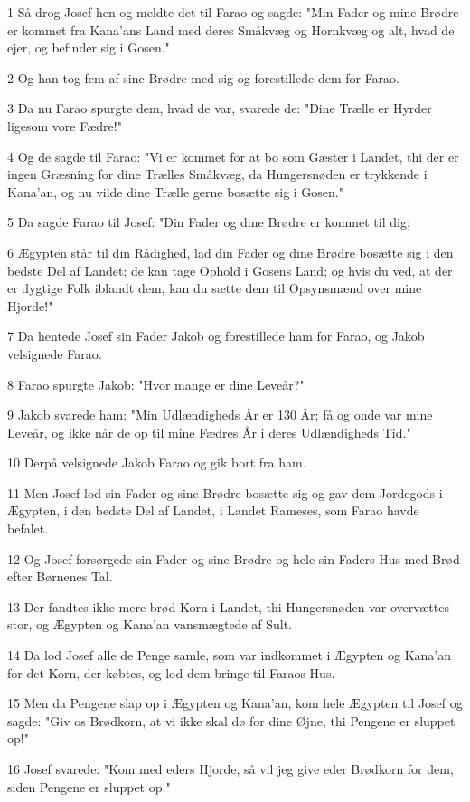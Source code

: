 \par 1 Så drog Josef hen og meldte det til Farao og sagde: "Min Fader og mine Brødre er kommet fra Kana'ans Land med deres Småkvæg og Hornkvæg og alt, hvad de ejer, og befinder sig i Gosen."
\par 2 Og han tog fem af sine Brødre med sig og forestillede dem for Farao.
\par 3 Da nu Farao spurgte dem, hvad de var, svarede de: "Dine Trælle er Hyrder ligesom vore Fædre!"
\par 4 Og de sagde til Farao: "Vi er kommet for at bo som Gæster i Landet, thi der er ingen Græsning for dine Trælles Småkvæg, da Hungersnøden er trykkende i Kana'an, og nu vilde dine Trælle gerne bosætte sig i Gosen."
\par 5 Da sagde Farao til Josef: "Din Fader og dine Brødre er kommet til dig;
\par 6 Ægypten står til din Rådighed, lad din Fader og dine Brødre bosætte sig i den bedste Del af Landet; de kan tage Ophold i Gosens Land; og hvis du ved, at der er dygtige Folk iblandt dem, kan du sætte dem til Opsynsmænd over mine Hjorde!"
\par 7 Da hentede Josef sin Fader Jakob og forestillede ham for Farao, og Jakob velsignede Farao.
\par 8 Farao spurgte Jakob: "Hvor mange er dine Leveår?"
\par 9 Jakob svarede ham: "Min Udlændigheds År er 130 År; få og onde var mine Leveår, og ikke når de op til mine Fædres År i deres Udlændigheds Tid."
\par 10 Derpå velsignede Jakob Farao og gik bort fra ham.
\par 11 Men Josef lod sin Fader og sine Brødre bosætte sig og gav dem Jordegods i Ægypten, i den bedste Del af Landet, i Landet Rameses, som Farao havde befalet.
\par 12 Og Josef forsørgede sin Fader og sine Brødre og hele sin Faders Hus med Brød efter Børnenes Tal.
\par 13 Der fandtes ikke mere brød Korn i Landet, thi Hungersnøden var overvættes stor, og Ægypten og Kana'an vansmægtede af Sult.
\par 14 Da lod Josef alle de Penge samle, som var indkommet i Ægypten og Kana'an for det Korn, der købtes, og lod dem bringe til Faraos Hus.
\par 15 Men da Pengene slap op i Ægypten og Kana'an, kom hele Ægypten til Josef og sagde: "Giv os Brødkorn, at vi ikke skal dø for dine Øjne, thi Pengene er sluppet op!"
\par 16 Josef svarede: "Kom med eders Hjorde, så vil jeg give eder Brødkorn for dem, siden Pengene er sluppet op."
